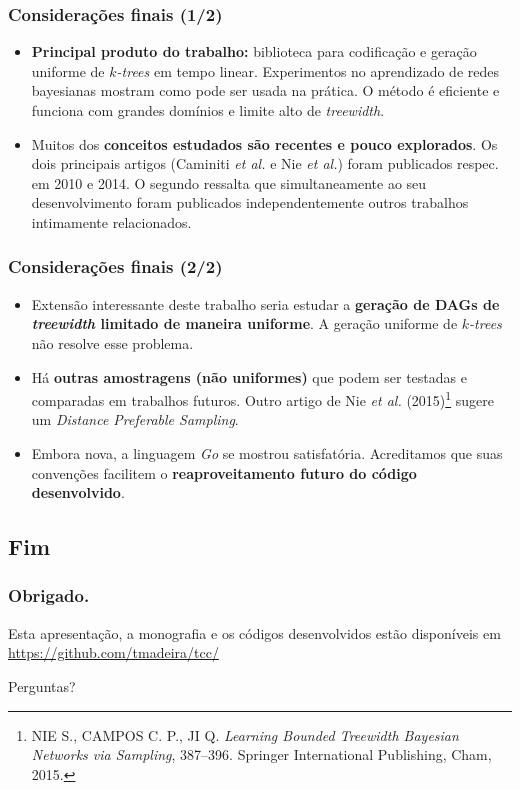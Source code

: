 \documentclass{beamer}
\begin{document}
  \begin{frame}
    \frametitle{Considerações finais (1/2)}

    \begin{itemize}
      \item \textbf{Principal produto do trabalho:} biblioteca para codificação e geração uniforme de \emph{$k$-trees} em tempo linear. Experimentos no aprendizado de redes bayesianas mostram como pode ser usada na prática. O método é eficiente e funciona com grandes domínios e limite alto de \emph{treewidth}.
      \item Muitos dos \textbf{conceitos estudados são recentes e pouco explorados}. Os dois principais artigos (Caminiti \emph{et al.} e Nie \emph{et al.}) foram publicados respec. em 2010 e 2014. O segundo ressalta que simultaneamente ao seu desenvolvimento foram publicados independentemente outros trabalhos intimamente relacionados.
    \end{itemize}
  \end{frame}

  \begin{frame}
    \frametitle{Considerações finais (2/2)}

    \begin{itemize}
      \item Extensão interessante deste trabalho seria estudar a \textbf{geração de DAGs de \emph{treewidth} limitado de maneira uniforme}. A geração uniforme de \emph{$k$-trees} não resolve esse problema.
      \item Há \textbf{outras amostragens (não uniformes)} que podem ser testadas e comparadas em trabalhos futuros. Outro artigo de Nie \emph{et al.} (2015)\footnote{\scriptsize NIE S., CAMPOS C. P., JI Q. \emph{Learning Bounded Treewidth Bayesian Networks via Sampling}, 387--396. Springer International Publishing, Cham, 2015.} sugere um \emph{Distance Preferable Sampling}.
      \item Embora nova, a linguagem \emph{Go} se mostrou satisfatória. Acreditamos que suas convenções facilitem o \textbf{reaproveitamento futuro do código desenvolvido}.
    \end{itemize}
  \end{frame}

  \subsection{Fim}

  \begin{frame}
    \frametitle{Obrigado.}

    Esta apresentação, a monografia e os códigos desenvolvidos estão disponíveis em \url{https://github.com/tmadeira/tcc/}

    \vspace{1em}

    Perguntas?
  \end{frame}
\end{document}
